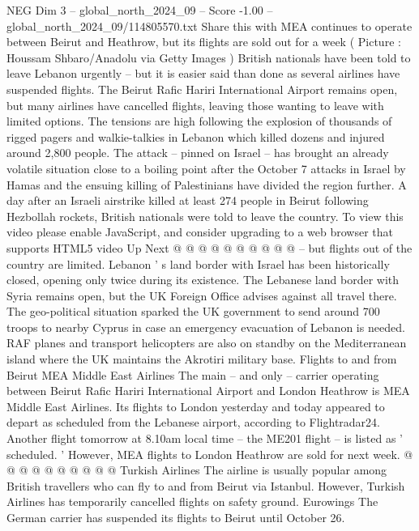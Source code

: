 \begin{textsample}{NEG Dim 3 – global\_north\_2024\_09 – Score -1.00 – global\_north\_2024\_09/114805570.txt}  \label{ex:f3_neg_294}
Share this with MEA continues to operate between Beirut and Heathrow, but its flights are sold out for a week ( Picture : Houssam Shbaro/Anadolu via Getty Images ) British nationals have been told to leave Lebanon urgently -- but it is easier said than done as several airlines have suspended flights.
The Beirut Rafic Hariri International Airport remains open, but many airlines have cancelled flights, leaving those wanting to leave with limited options.
The tensions are high following the explosion of thousands of rigged pagers and walkie-talkies in Lebanon which killed dozens and injured around 2,800 people.
The attack -- pinned on Israel -- has brought an already volatile situation close to a boiling point after the October 7 attacks in Israel by Hamas and the ensuing killing of Palestinians have divided the region further.
A day after an Israeli airstrike killed at least 274 people in Beirut following Hezbollah rockets, British nationals were told to leave the country.
To view this video please enable JavaScript, and consider upgrading to a web browser that supports HTML5 video Up Next @ @ @ @ @ @ @ @ @ @ -- but flights out of the country are limited.
Lebanon ' s land border with Israel has been historically closed, opening only twice during its existence.
The Lebanese land border with Syria remains open, but the UK Foreign Office advises against all travel there.
The geo-political situation sparked the UK government to send around 700 troops to nearby Cyprus in case an emergency evacuation of Lebanon is needed.
RAF planes and transport helicopters are also on standby on the Mediterranean island where the UK maintains the Akrotiri military base.
Flights to and from Beirut MEA Middle East Airlines The main -- and only -- carrier operating between Beirut Rafic Hariri International Airport and London Heathrow is MEA Middle East Airlines.
Its flights to London yesterday and today appeared to depart as scheduled from the Lebanese airport, according to Flightradar24.
Another flight tomorrow at 8.10am local time -- the ME201 flight -- is listed as ' scheduled. ' However, MEA flights to London Heathrow are sold for next week. @ @ @ @ @ @ @ @ @ @ Turkish Airlines The airline is usually popular among British travellers who can fly to and from Beirut via Istanbul.
However, Turkish Airlines has temporarily cancelled flights on safety ground.
Eurowings The German carrier has suspended its flights to Beirut until October 26.

\end{textsample}
